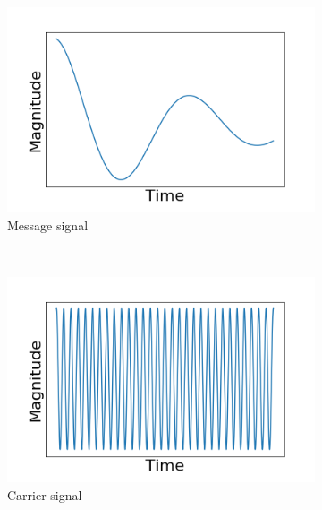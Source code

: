 \documentclass[]{article}
\begin{document}
\begin{figure}[h!]
	\centering
	\begin{subfigure}[b]{0.3\textwidth}
		\includegraphics[width=\textwidth]{figs/amplitude_modulation/dsb/message_signal.png}
		\caption{Message signal}
		\label{fig:dsb_message_signal}
	\end{subfigure}
	~ %
	\begin{subfigure}[b]{0.3\textwidth}
		\includegraphics[width=\textwidth]{figs/amplitude_modulation/dsb/carrier_signal.png}
		\caption{Carrier signal}
		\label{fig:dsb_carrier_signal}
	\end{subfigure}
	~ %
	\begin{subfigure}[b]{0.3\textwidth}

\end{subfigure}
\end{figure}
\end{document}
